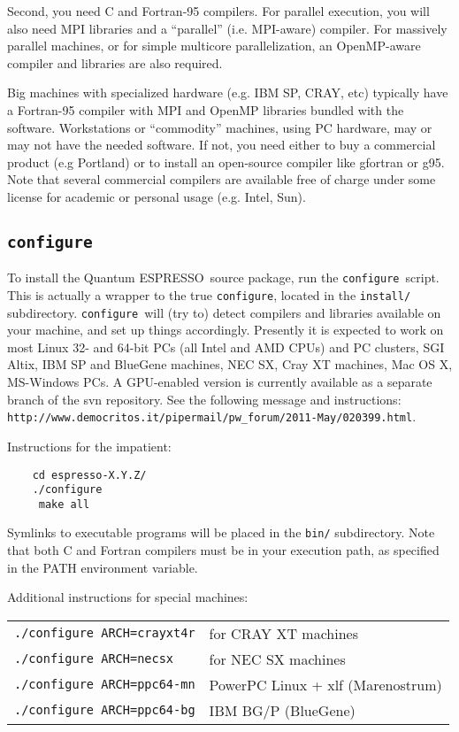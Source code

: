 \documentclass[12pt,a4paper]{article}
\def\qe{{\sc Quantum ESPRESSO}}
\def\configure{\texttt{configure}}
\begin{document}
Second, you need C and Fortran-95 compilers. For parallel 
execution, you will also need MPI libraries and a ``parallel''
(i.e. MPI-aware) compiler. For massively parallel machines, or 
for simple multicore parallelization, an OpenMP-aware compiler
and libraries are also required.

Big machines with
specialized hardware (e.g. IBM SP, CRAY, etc) typically have a
Fortran-95 compiler with MPI and OpenMP libraries bundled with 
the software. Workstations or ``commodity'' machines, using PC 
hardware, may or may not have the needed software. If not, you need 
either to buy a commercial product (e.g Portland) or to install
an open-source compiler like gfortran or g95. 
Note that several commercial compilers are available free of charge
under some license for academic or personal usage (e.g. Intel, Sun). 

\subsection{\configure}

To install the \qe\ source package, run the \configure{}ript. This is actually a wrapper to the true \configure,
located in the \texttt{install/} subdirectory. \configure\
will (try to) detect compilers and libraries available on
your machine, and set up things accordingly. Presently it is expected
to work on most Linux 32- and 64-bit PCs (all Intel and AMD CPUs) and 
PC clusters, SGI Altix, IBM SP and BlueGene machines, NEC SX, Cray XT
machines, Mac OS X, MS-Windows PCs. A GPU-enabled version is currently
available as a separate branch of the svn repository. See the following 
message and instructions:\\
\texttt{http://www.democritos.it/pipermail/pw\_forum/2011-May/020399.html}.

Instructions for the impatient:
\begin{verbatim}
    cd espresso-X.Y.Z/
    ./configure
     make all
\end{verbatim}
Symlinks to executable programs will be placed in the
\texttt{bin/}
subdirectory. Note that both C and Fortran compilers must be in your execution
path, as specified in the PATH environment variable.

Additional instructions for special machines:

\begin{tabular}{ll}
    \texttt{./configure ARCH=crayxt4r}& for CRAY XT machines \\
    \texttt{./configure ARCH=necsx}   & for NEC SX machines \\
    \texttt{./configure ARCH=ppc64-mn}& PowerPC Linux + xlf (Marenostrum) \\
    \texttt{./configure ARCH=ppc64-bg}& IBM BG/P (BlueGene)
\end{tabular}
    
\end{document}
